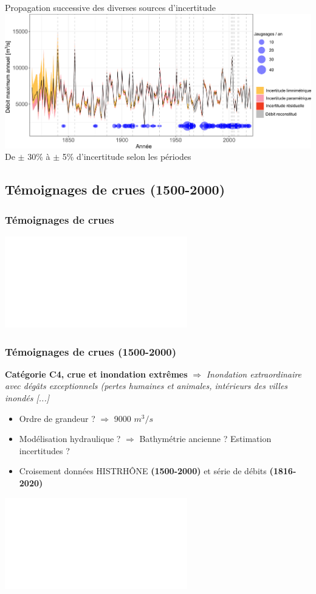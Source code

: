 \documentclass[compress,9pt]{beamer}
\begin{document}
\begin{frame}
\begin{minipage}{0.2\textwidth}
		\end{minipage}
		\hfill
		\begin{minipage}{0.78\textwidth}
			\centering
			Propagation successive des diverses sources d'incertitude\\
			\vspace{10pt}
			\includegraphics[width = \textwidth]{./Figures/uQ.pdf} 
			\centering
			\vspace{10pt}
			De $\pm$ 30\% à $\pm$ 5\% d'incertitude selon les périodes
		\end{minipage}
	\end{frame}	
		
	\subsection{Témoignages de crues (1500-2000)}
	\begin{frame}[t]
		\frametitle{Témoignages de crues}
		\centering
		\includegraphics<1>[width = .6\textwidth]{./Figures/HistoFloods2.pdf} 		
	\end{frame}		
	
	\begin{frame}[t]
		\frametitle{Témoignages de crues (1500-2000)}
		\vfill
		\textbf{Catégorie C4, crue et inondation
extrêmes} $\Rightarrow$ \og \textit{Inondation extraordinaire avec dégâts exceptionnels (pertes humaines et animales, intérieurs des villes inondés [...]}\fg{}  
	\vfill
		\begin{itemize}
			\item<2->[$\vartriangleright$] Ordre de grandeur ? \citet{pichard_hydro-climatology_2017} $\Rightarrow$ 9000 $m^3/s$ 
			\item<3->[$\vartriangleright$] Modélisation hydraulique ? $\Rightarrow$ Bathymétrie ancienne ? Estimation incertitudes ?
			\item<4->[$\vartriangleright$] Croisement données HISTRHÔNE \textbf{(1500-2000)} et série de débits  \textbf{(1816-2020)}
		\end{itemize}
		\vfill
		\centering
		\includegraphics<5>[width = .7\textwidth]{./Figures/C4_SystematicPeriod-FR.pdf} 	
	\end{frame}		
		
\end{document}

